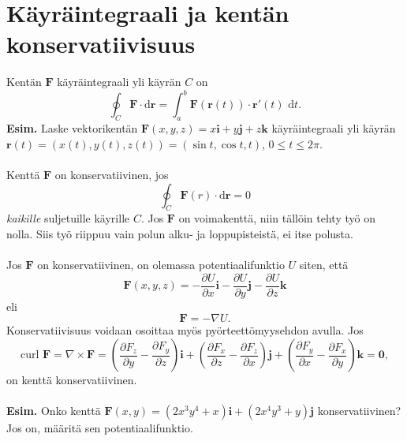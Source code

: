 \documentclass{article}
\begin{document}
\newpage
\section{Käyräintegraali ja kentän konservatiivisuus}
Kentän \(\mathbf{F}\) käyräintegraali yli käyrän \(C\) on $$\oint_C \mathbf{F}\cdot \text{d}\mathbf{r}=\int_a^b \mathbf{F}(\mathbf{r}(t))\cdot \mathbf{r}'(t)\text{ d}t.$$ \textbf{Esim.} Laske vektorikentän \(\mathbf{F}(x, y, z)=x\mathbf{i}+y\mathbf{j}+z\mathbf{k}\) käyräintegraali yli käyrän \(\mathbf{r}(t)=(x(t), y(t), z(t))=(\sin t, \cos t, t)\), \(0\leq t\leq 2\pi\).\\
 \\
Kenttä \(\mathbf{F}\) on konservatiivinen, jos $$\oint_C \mathbf{F}(r)\cdot \text{d}\mathbf{r}=0$$ \emph{kaikille} suljetuille käyrille \(C\). Jos \(\mathbf{F}\) on voimakenttä, niin tällöin tehty työ on nolla. Siis työ riippuu vain polun alku- ja loppupisteistä, ei itse polusta.\\
 \\
Jos \(\mathbf{F}\) on konservatiivinen, on olemassa potentiaalifunktio \(U\) siten, että $$\mathbf{F}(x, y, z)=-\frac{\partial U}{\partial x}\mathbf{i}-\frac{\partial U}{\partial y}\mathbf{j}-\frac{\partial U}{\partial z}\mathbf{k}$$ eli $$\mathbf{F}=-\nabla U.$$ Konservatiivisuus voidaan osoittaa myös pyörteettömyysehdon avulla. Jos $$\text{curl }\mathbf{F}=\nabla \times \mathbf{F}=\left (\frac{\partial F_z}{\partial y}-\frac{\partial F_y}{\partial z} \right ) \mathbf{i}+\left (\frac{\partial F_x}{\partial z}-\frac{\partial F_z}{\partial x} \right ) \mathbf{j}+\left (\frac{\partial F_y}{\partial x}-\frac{\partial F_x}{\partial y} \right ) \mathbf{k}=\mathbf{0},$$ on kenttä konservatiivinen.\\
 \\
\textbf{Esim.} Onko kenttä \(\mathbf{F}(x, y)=(2x^3y^4+x)\mathbf{i}+(2x^4y^3+y)\mathbf{j}\) konservatiivinen? Jos on, määritä sen potentiaalifunktio.

\newpage
\end{document}
